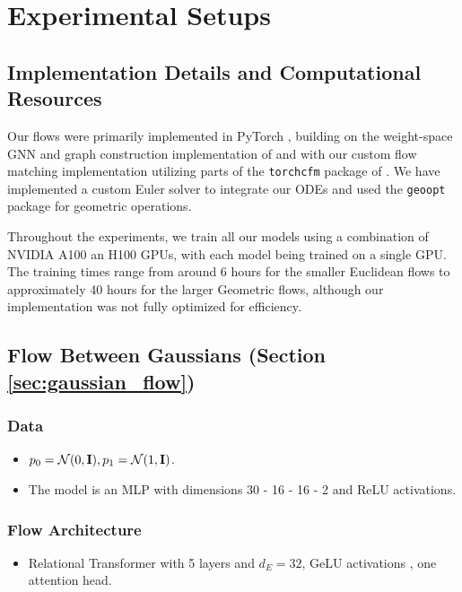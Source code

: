 
\chapter{Experimental Setups}\label{appendix:experimental_setups}

\section*{Implementation Details and Computational Resources}

Our flows were primarily implemented in PyTorch \citep{paszkePyTorchImperativeStyle2019a}, building on the weight-space GNN and graph construction implementation of \citep{kofinasGraphNeuralNetworks2024} and with our custom flow matching implementation utilizing parts of the \texttt{torchcfm} package of \citep{tongImprovingGeneralizingFlowbased2023}. We have implemented a custom Euler solver to integrate our ODEs and used the \texttt{geoopt} package \citep{kochurovGeooptRiemannianOptimization2020} for geometric operations.

Throughout the experiments, we train all our models using a combination of NVIDIA A100 an H100 GPUs, with each model being trained on a single GPU. The training times range from around 6 hours for the smaller Euclidean flows to approximately 40 hours for the larger Geometric flows, although our implementation was not fully optimized for efficiency. 

\section*{Flow Between Gaussians (Section \ref{sec:gaussian_flow})}

\subsection*{Data}

\begin{itemize}
    \item $p_0 = \mathcal{N}(0, \mathbf{I}), p_1 = \mathcal{N}(1, \mathbf{I})$. 
    \item The model is an MLP with dimensions 30 - 16 - 16 - 2 and ReLU activations. 
\end{itemize}

\subsection*{Flow Architecture}
\begin{itemize}
    \item Relational Transformer \citep{diaoRelationalAttentionGeneralizing2023,kofinasGraphNeuralNetworks2024} with 5 layers and $d_E = 32$, GeLU activations \citep{hendrycksGaussianErrorLinear2023a}, one attention head. 
\end{itemize}

